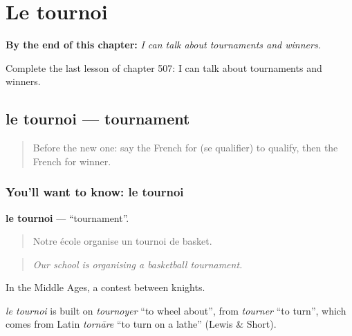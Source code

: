 
\chapter{Le tournoi}
\label{ch:fr-le-tournoi}

\begin{chapteropening}
\textbf{By the end of this chapter:} \emph{I can talk about tournaments and winners.}

Complete the last lesson of chapter 507: I can talk about tournaments and winners.
\end{chapteropening}

\section[le tournoi]{le tournoi — tournament}

\label{lesson:FR-C507-tournoi}



\begin{quote}
Before the new one: say the French for (se qualifier) to qualify, then the French for winner.
\end{quote}

\subsection*{You'll want to know: le tournoi}
\textbf{le tournoi} — \textquotedblleft{}tournament\textquotedblright{}.

\begin{quote}
Notre école organise un tournoi de basket.
\end{quote}

\begin{quote}
\emph{Our school is organising a basketball tournament.}
\end{quote}

In the Middle Ages, a contest between knights.

\begin{cousinweb}
\emph{le tournoi} is built on \emph{tournoyer} \textquotedblleft{}to wheel about\textquotedblright{}, from \emph{tourner} \textquotedblleft{}to turn\textquotedblright{}, which comes from Latin \emph{tornāre} \textquotedblleft{}to turn on a lathe\textquotedblright{} (Lewis \& Short).
\end{cousinweb}

